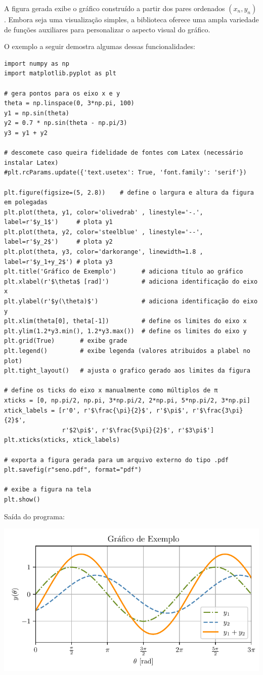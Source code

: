 A figura gerada exibe o gráfico construído a partir dos pares ordenados $(x_n, y_n)$.
Embora seja uma visualização simples, a biblioteca  oferece uma ampla variedade
de funções auxiliares para personalizar o aspecto visual do gráfico.

O exemplo a seguir demostra algumas dessas funcionalidades:
\begin{verbatim}
import numpy as np
import matplotlib.pyplot as plt

# gera pontos para os eixo x e y
theta = np.linspace(0, 3*np.pi, 100)
y1 = np.sin(theta)
y2 = 0.7 * np.sin(theta - np.pi/3)
y3 = y1 + y2

# descomete caso queira fidelidade de fontes com Latex (necessário instalar Latex)
#plt.rcParams.update({'text.usetex': True, 'font.family': 'serif'})

plt.figure(figsize=(5, 2.8))    # define o largura e altura da figura em polegadas
plt.plot(theta, y1, color='olivedrab' , linestyle='-.', label=r'$y_1$')     # plota y1
plt.plot(theta, y2, color='steelblue' , linestyle='--', label=r'$y_2$')     # plota y2
plt.plot(theta, y3, color='darkorange', linewidth=1.8 , label=r'$y_1+y_2$') # plota y3
plt.title('Gráfico de Exemplo')       # adiciona título ao gráfico
plt.xlabel(r'$\theta$ [rad]')         # adiciona identificação do eixo x
plt.ylabel(r'$y(\theta)$')            # adiciona identificação do eixo y
plt.xlim(theta[0], theta[-1])         # define os limites do eixo x
plt.ylim(1.2*y3.min(), 1.2*y3.max())  # define os limites do eixo y
plt.grid(True)       # exibe grade
plt.legend()         # exibe legenda (valores atribuidos a plabel no plot)
plt.tight_layout()   # ajusta o grafico gerado aos limites da figura

# define os ticks do eixo x manualmente como múltiplos de π
xticks = [0, np.pi/2, np.pi, 3*np.pi/2, 2*np.pi, 5*np.pi/2, 3*np.pi]
xtick_labels = [r'0', r'$\frac{\pi}{2}$', r'$\pi$', r'$\frac{3\pi}{2}$',
                r'$2\pi$', r'$\frac{5\pi}{2}$', r'$3\pi$']
plt.xticks(xticks, xtick_labels)

# exporta a figura gerada para um arquivo externo do tipo .pdf
plt.savefig(r"seno.pdf", format="pdf")

# exibe a figura na tela
plt.show()
\end{verbatim}

Saída do programa:
\begin{center}
    \includegraphics[scale=1.0]{figs/seno}
\end{center}

